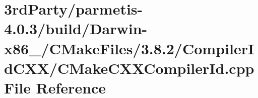 \hypertarget{3rd_party_2parmetis-4_80_83_2build_2_darwin-x86__64_2_c_make_files_23_88_82_2_compiler_id_c_x_x_2_c_make_c_x_x_compiler_id_8cpp}{}\section{3rd\+Party/parmetis-\/4.0.3/build/\+Darwin-\/x86\+\_/\+C\+Make\+Files/3.8.2/\+Compiler\+Id\+C\+X\+X/\+C\+Make\+C\+X\+X\+Compiler\+Id.cpp File Reference}
\label{3rd_party_2parmetis-4_80_83_2build_2_darwin-x86__64_2_c_make_files_23_88_82_2_compiler_id_c_x_x_2_c_make_c_x_x_compiler_id_8cpp}
